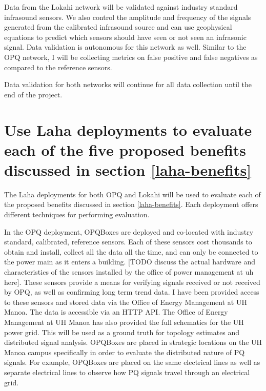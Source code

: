 Data from the Lokahi network will be validated against industry standard infrasound sensors. We also control the amplitude and frequency of the signals generated from the calibrated infrasound source and can use geophysical equations to predict which sensors should have seen or not seen an infrasonic signal. Data validation is autonomous for this network as well. Similar to the OPQ network, I will be collecting metrics on false positive and false negatives as compared to the reference sensors. 

Data validation for both networks will continue for all data collection until the end of the project.

\section{Use Laha deployments to evaluate each of the five proposed benefits discussed in section \ref{laha-benefits}}
The Laha deployments for both OPQ and Lokahi will be used to evaluate each of the proposed benefits discussed in section \ref{laha-benefits}. Each deployment offers different techniques for performing evaluation. 

In the OPQ deployment, OPQBoxes are deployed and co-located with industry standard, calibrated, reference sensors. Each of these sensors cost thousands to obtain and install, collect all the data all the time, and can only be connected to the power main as it enters a building. [TODO discuss the actual hardware and characteristics of the sensors installed by the office of power management at uh here]. These sensors provide a means for verifying signals received or not received by OPQ, as well as confirming long term trend data. I have been provided access to these sensors and stored data via the Office of Energy Management at UH Manoa. The data is accessible via an HTTP API. The Office of Energy Management at UH Manoa has also provided the full schematics for the UH power grid. This will be used as a ground truth for topology estimates and distributed signal analysis. OPQBoxes are placed in strategic locations on the UH Manoa campus specifically in order to evaluate the distributed nature of PQ signals. For example, OPQBoxes are placed on the same electrical lines as well as separate electrical lines to observe how PQ signals travel through an electrical grid.


